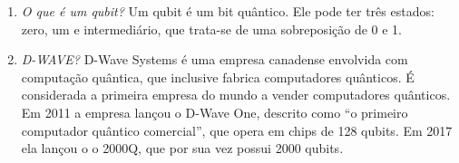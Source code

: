 \documentclass[12pt]{article}
\begin{document}
\begin{enumerate}
\item \textit{O que é um qubit?} Um qubit é um bit quântico. Ele pode ter três estados: zero, um e intermediário, que trata-se de uma sobreposição de 0 e 1.

\item \textit{D-WAVE?} D-Wave Systems é uma empresa canadense envolvida com computação quântica, que inclusive fabrica computadores quânticos. É considerada a primeira empresa do mundo a vender computadores quânticos. Em 2011 a empresa lançou o D-Wave One, descrito como ``o primeiro computador quântico comercial'', que opera em chips de 128 qubits. Em 2017 ela lançou o o 2000Q, que por sua vez possui 2000 qubits.

\end{enumerate}
\end{document}
